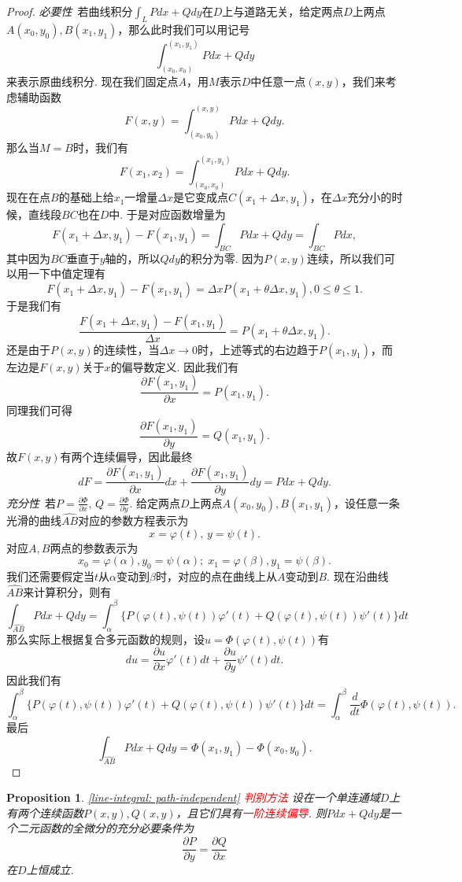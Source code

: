 \documentclass{article}
\newtheorem{proposition}[theorem]{Proposition}
\newcommand{\redt}[1]{\textcolor{red}{#1}}
\begin{document}
\begin{proof}
\rm \emph{必要性}\ 若曲线积分$\int_L Pdx + Qdy$在$D$上与道路无关，给定两点$D$上两点$A(x_0,y_0),B(x_1,y_1)$，那么此时我们可以用记号
$$
\int_{(x_0,x_0)}^{(x_1,y_1)} Pdx+Qdy
$$
来表示原曲线积分. 现在我们固定点$A$，用$M$表示$D$中任意一点$(x,y)$，我们来考虑辅助函数
$$
F(x,y) = \int_{(x_0,y_0)}^{(x,y)} Pdx+Qdy.
$$
那么当$M=B$时，我们有
$$
F(x_1,x_2) = \int_{(x_0,x_0)}^{(x_1,y_1)} Pdx+Qdy.
$$
现在在点$B$的基础上给$x_1$一增量$\Delta x$是它变成点$C(x_1+\Delta x,y_1)$，在$\Delta x$充分小的时候，直线段$BC$也在$D$中. 于是对应函数增量为
$$
F(x_1+\Delta x ,y_1)-F(x_1,y_1) = \int_{\overline{BC}}Pdx+ Qdy = \int_{\overline{BC}} Pdx,
$$ 
其中因为$BC$垂直于$y$轴的，所以$Qdy$的积分为零. 因为$P(x,y)$连续，所以我们可以用一下中值定理有
$$
F(x_1+\Delta x ,y_1)-F(x_1,y_1) = \Delta x P(x_1+\theta \Delta x,y_1),  0 \leq \theta \leq 1.
$$
于是我们有
$$
\frac{F(x_1+\Delta x ,y_1)-F(x_1,y_1)}{\Delta x} = P(x_1+\theta \Delta x, y_1).
$$
还是由于$P(x,y)$的连续性，当$\Delta x \to 0$时，上述等式的右边趋于$P(x_1,y_1)$，而左边是$F(x,y)$关于$x$的偏导数定义. 因此我们有
$$
\frac{\partial F(x_1,y_1)}{\partial x} = P(x_1,y_1). 
$$
同理我们可得
$$
\frac{\partial F(x_1,y_1)}{\partial y} = Q(x_1,y_1). 
$$
故$F(x,y)$有两个连续偏导，因此最终
$$
dF = \frac{\partial F(x_1,y_1)}{\partial x}dx + \frac{\partial F(x_1,y_1)}{\partial y}dy = Pdx +Qdy.
$$
\emph{充分性}\ 若$P=\frac{\partial \Phi}{\partial x},\,Q=\frac{\partial \Phi}{\partial y}$. 给定两点$D$上两点$A(x_0,y_0),B(x_1,y_1)$，设任意一条光滑的曲线$\widehat{AB}$对应的参数方程表示为
$$
x = \varphi(t),\, y = \psi(t).
$$
对应$A,B$两点的参数表示为
$$
x_0 = \varphi(\alpha),y_0 =\psi(\alpha);\; x_1 =\varphi(\beta), y_1 = \psi(\beta).
$$
我们还需要假定当$t$从$\alpha$变动到$\beta$时，对应的点在曲线上从$A$变动到$B$. 现在沿曲线$\widehat{AB}$来计算积分，则有
$$
\int_{\widehat{AB}}Pdx+ Qdy = \int_\alpha^\beta \{P(\varphi(t),\psi(t))\varphi'(t) + Q(\varphi(t),\psi(t))\psi'(t)\}dt
$$
那么实际上根据复合多元函数的规则，设$u = \Phi(\varphi(t),\psi(t)) $有
$$
du = \frac{\partial u}{\partial x}\varphi'(t)dt + \frac{\partial u}{\partial y}\psi'(t)dt.
$$
因此我们有
$$
\int_\alpha^\beta \{P(\varphi(t),\psi(t))\varphi'(t) + Q(\varphi(t),\psi(t))\psi'(t)\}dt = \int_\alpha^\beta \frac{d}{dt} \Phi(\varphi(t),\psi(t)).
$$
最后
$$
\int_{\widehat{AB}}Pdx+ Qdy = \Phi(x_1,y_1)-\Phi(x_0,y_0). 
$$
\end{proof}

\begin{proposition}
\rm \redt{\ref{line-integral: path-independent} 判别方法} 设在一个单连通域$D$上有两个连续函数$P(x,y),Q(x,y)$，且它们具有\redt{一阶连续偏导}. 则$Pdx + Qdy$是一个二元函数的全微分的充分必要条件为
$$
\frac{\partial P}{\partial y} = \frac{\partial Q}{\partial x}
$$
在$D$上恒成立. 
\end{proposition}
\end{document}
